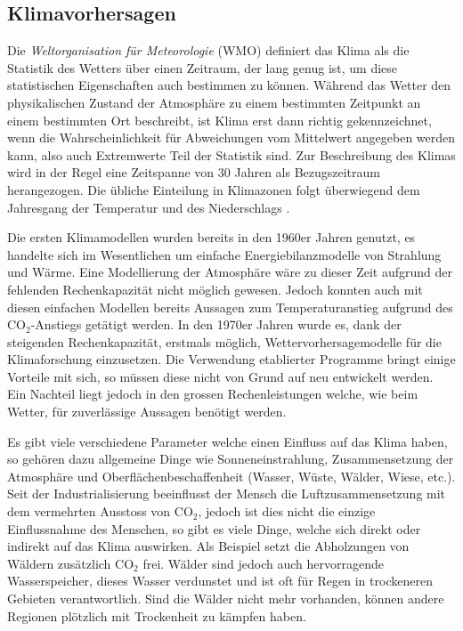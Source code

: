 \begin{refsection}
\subsection{Klimavorhersagen
\label{klima:subsection:entstehung}}
Die {\em Weltorganisation für Meteorologie} (WMO) definiert das Klima als die Statistik des Wetters über einen Zeitraum, der lang genug ist, um diese statistischen Eigenschaften auch bestimmen zu können. Während das Wetter den physikalischen Zustand der Atmosphäre zu einem bestimmten Zeitpunkt an einem bestimmten Ort beschreibt, ist Klima erst dann richtig gekennzeichnet, wenn die Wahrscheinlichkeit für Abweichungen vom Mittelwert angegeben werden kann, also auch Extremwerte Teil der Statistik sind. Zur Beschreibung des Klimas wird in der Regel eine Zeitspanne von 30 Jahren als Bezugszeitraum herangezogen. Die übliche Einteilung in Klimazonen folgt überwiegend dem Jahresgang der Temperatur und des Niederschlags \cite{klima:maxplanck}.

Die ersten Klimamodellen wurden bereits in den 1960er Jahren genutzt, es handelte sich im Wesentlichen um einfache Energiebilanzmodelle von Strahlung und Wärme. Eine Modellierung der Atmosphäre wäre zu dieser Zeit aufgrund der fehlenden Rechenkapazität nicht möglich gewesen. Jedoch konnten auch mit diesen einfachen Modellen bereits Aussagen zum Temperaturanstieg aufgrund des CO$_2$-Anstiegs getätigt werden. In den 1970er Jahren wurde es, dank der steigenden Rechenkapazität, erstmals möglich, Wettervorhersagemodelle für die Klimaforschung einzusetzen. Die Verwendung etablierter Programme bringt einige Vorteile mit sich, so müssen diese nicht von Grund auf neu entwickelt werden. Ein Nachteil liegt jedoch in den grossen Rechenleistungen welche, wie beim Wetter, für zuverlässige Aussagen benötigt werden.
 
Es gibt viele verschiedene Parameter welche einen Einfluss auf das Klima haben, so gehören dazu  allgemeine Dinge wie Sonneneinstrahlung, Zusammensetzung der Atmosphäre und Oberflächenbeschaffenheit (Wasser, Wüste, Wälder, Wiese, etc.). Seit der Industrialisierung beeinflusst der Mensch die Luftzusammensetzung mit dem vermehrten Ausstoss von CO$_2$, jedoch ist dies nicht die einzige Einflussnahme des Menschen, so gibt es viele Dinge, welche sich direkt oder indirekt auf das Klima auswirken. Als Beispiel setzt die Abholzungen von Wäldern zusätzlich CO$_2$ frei. Wälder sind jedoch auch hervorragende Wasserspeicher, dieses Wasser verdunstet und ist oft für Regen in trockeneren Gebieten verantwortlich. Sind die Wälder nicht mehr vorhanden, können andere Regionen plötzlich mit Trockenheit zu kämpfen haben.


\end{refsection}
